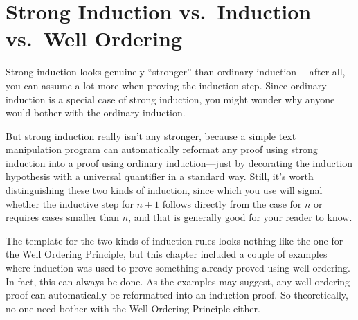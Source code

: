 
\begin{problems}
\practiceproblems
{}

\classproblems
{}

\homeworkproblems
{}

\examproblems
{}

\end{problems}

\section{Strong Induction vs.\ Induction vs.\ Well Ordering}
\label{versusWO}
Strong induction looks genuinely ``stronger'' than ordinary induction
---after all, you can assume a lot more when proving the induction
step.  Since ordinary induction is a special case of strong induction,
you might wonder why anyone would bother with the ordinary induction.

But strong induction really isn't any stronger, because a simple text
manipulation program can automatically reformat any proof using strong
induction into a proof using ordinary induction---just by decorating the
induction hypothesis with a universal quantifier in a standard way.
Still, it's worth distinguishing these two kinds of induction, since which
you use will signal whether the inductive step for $n+1$ follows directly
from the case for $n$ or requires cases smaller than $n$, and that is
generally good for your reader to know.

The template for the two kinds of induction rules looks nothing like
the one for the Well Ordering Principle, but this chapter
included a couple of examples where induction was used to prove
something already proved using well ordering.  In fact, this can
always be done.  As the examples may suggest, any well ordering proof
can automatically be reformatted into an induction proof.  So
theoretically, no one need bother with the Well Ordering Principle
either.

